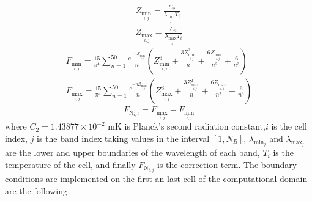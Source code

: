 \documentclass{warpdoc}
\begin{document}
\begin{equation} \begin{split} Z_{\min_{i,j}}=\frac{C_2}{\lambda_{{\min}_j}T_i} \\ Z_{\max_{i,j}}=\frac{C_2}{\lambda_{{\max}_j}T_i} \end{split} \label{eq:zita}\end{equation}
\begin{equation} \begin{split} F_{\min_{i,j}}=\frac{15}{\pi^4} \sum_{n=1}^{50} \frac{e^{-nZ_{\min_{i,j}}}}{n}(Z_{\min_{i,j}}^3+\frac{3Z_{\min_{i,j}}^2}{n}+\frac{6Z_{\min_{i,j}}}{n^2}+\frac{6}{n^3}) \\ F_{\max_{i,j}}=\frac{15}{\pi^4} \sum_{n=1}^{50} \frac{e^{-nZ_{\max_{i,j}}}}{n}(Z_{\max_{i,j}}^3+\frac{3Z_{\max_{i,j}}^2}{n}+\frac{6Z_{\max_{i,j}}}{n^2}+\frac{6}{n^3})  \end{split}\label{eq:FF} \end{equation}
\begin{equation} F_{\text{N}_{{i,j}}}=F_{\max_{i,j}}-F_{\min_{i,j}}\label{eq:Fn} \end{equation}
where $C_2=1.43877\times 10^{-2}$ mK is Planck's second radiation constant,$i$ is the cell index, $j$ is the band index taking values in the interval $[1,N_B]$, $\lambda_{{\min}_j}$ and $\lambda_{{\max}_j}$ are the lower and upper boundaries of the wavelength of each band, $T_i$ is the temperature of the cell, and finally $F_{\text{N}_{{i,j}}}$ is the correction term. The boundary conditions are implemented on the first an last cell of the computational domain are the following
\end{document}
